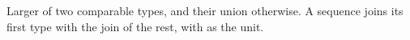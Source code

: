 Larger of two comparable types, and their union otherwise. A sequence joins its first type with the join of
the rest, with  as the unit.
